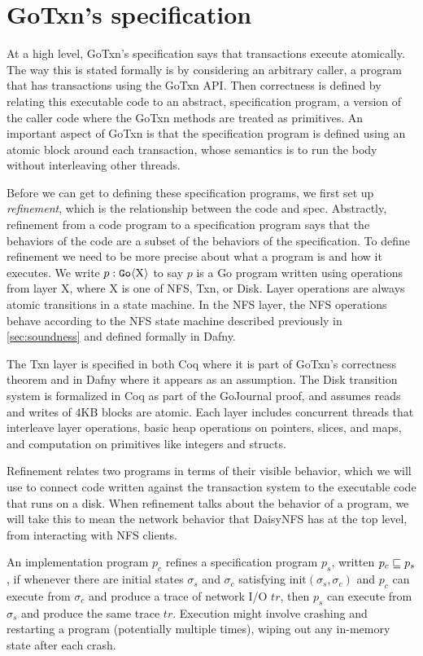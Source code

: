 \section{GoTxn's specification}

At a high level, GoTxn's specification says that transactions execute
atomically. The way this is stated formally is by considering an arbitrary
caller, a program that has transactions using the GoTxn API. Then correctness is
defined by relating this executable code to an abstract, specification program,
a version of the caller code where the GoTxn methods are treated as primitives.
An important aspect of GoTxn is that the specification program is defined using
an atomic block around each transaction, whose semantics is to run the body
without interleaving other threads.

Before we can get to defining these specification programs, we first set up
\emph{refinement}, which is the relationship between the code and spec.
Abstractly, refinement from a code program to
a specification program says that the behaviors of the code are a subset of the
behaviors of the specification.
To define refinement we need to be more precise about what a program is and how it
executes. We
write $p : \mathtt{Go}\langle \mathrm{X} \rangle$ to say $p$ is a Go program written using operations
from layer X, where X is one of NFS, Txn, or Disk.
Layer operations are always atomic transitions in a state machine. In the
NFS layer, the NFS operations behave according to the NFS state machine
described previously in \autoref{sec:soundness} and defined formally in Dafny.

The Txn layer is specified in both Coq where it is part of GoTxn's correctness
theorem and in Dafny where it appears as an assumption. The Disk transition
system is formalized in Coq as part of the GoJournal proof, and assumes reads
and writes of 4KB blocks are atomic. Each layer includes concurrent threads that
interleave layer operations, basic heap operations on pointers, slices, and
maps, and computation on primitives like integers and structs.

Refinement relates two programs in terms of their visible behavior, which we
will use to connect code written against the transaction system to the
executable code that runs on a disk. When refinement talks about the behavior of
a program, we will take this to mean the network behavior that DaisyNFS has at
the top level, from interacting with NFS clients.

\begin{definition}[Refinement]
  An implementation program $p_{c}$ refines a specification program $p_{s}$,
written $p_{c} \sqsubseteq p_{s}$, if whenever there are initial states
$\sigma_{s}$ and $\sigma_{c}$ satisfying $\mathrm{init}(\sigma_{s}, \sigma_{c})$
and $p_{c}$ can execute from $\sigma_{c}$ and produce a trace of network I/O
$tr$, then $p_{s}$ can execute from $\sigma_{s}$ and produce the same trace
$tr$.  Execution might involve crashing and restarting a program (potentially
multiple times), wiping out any in-memory state after each crash.
  \label{def:refinement}
\end{definition}

